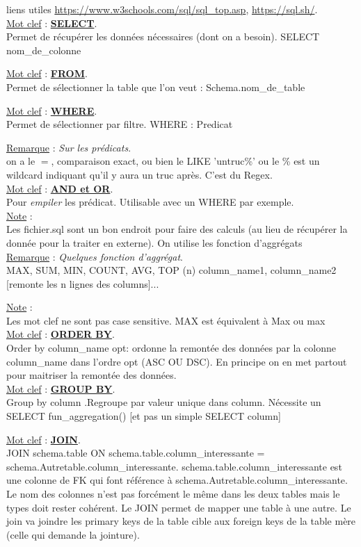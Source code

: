 \documentclass[a4paper,12pt,twoside]{article}
\newcommand{\urlcolor}{magenta}  %
\newcommand{\keycolor}{purple} %
\newcommand{\rem}[2]{\noindent\underline{Remarque} : \textit{#1}.\\ \indent #2}
\newcommand{\note}[1]{\noindent\underline{Note} : \\ \indent #1}
\newcommand{\keyref}[2]{\hypersetup{urlcolor=\keycolor} \href{#1}{\textbf{#2}}\hypersetup{urlcolor=\urlcolor}}
\newcommand{\keyword}[3]{\noindent\underline{Mot clef} : \keyref{#1}{#2}. \\ \indent #3}
\begin{document}
liens utiles \url{https://www.w3schools.com/sql/sql_top.asp}, \url{https://sql.sh/}.\\

\keyword{https://sql.sh/cours/select}{SELECT}{Permet de récupérer les données nécessaires (dont on a besoin). SELECT nom\_de\_colonne}

\keyword{https://sql.sh/cours/select}{FROM}{Permet de sélectionner la table que l'on veut : Schema.nom\_de\_table}

\keyword{https://sql.sh/cours/where}{WHERE}{Permet de sélectionner par filtre. WHERE : Predicat}

\rem{Sur les prédicats}{on a le $=$, comparaison exact, ou bien le LIKE 'untruc\%' ou le \% est un wildcard indiquant qu'il y aura un truc après. C'est du Regex.}\\

\keyword{https://sql.sh/cours/where/and-or}{AND et OR}{Pour \textit{empiler} les prédicat. Utilisable avec un WHERE par exemple.}\\

\note{Les fichier.sql sont un bon endroit pour faire des calculs (au lieu de récupérer la donnée pour la traiter en externe). On utilise les fonction d'aggrégats}\\

\rem{Quelques fonction d'aggrégat}{MAX, SUM, MIN, COUNT, AVG, TOP (n) column\_name1, column\_name2 [remonte les n lignes des columns]...}

\note{Les mot clef ne sont pas case sensitive. MAX est équivalent à Max ou max}\\

\keyword{https://sql.sh/cours/order-by}{ORDER BY}{Order by column\_name opt: ordonne la remontée des données par la colonne column\_name dans l'ordre opt (ASC OU DSC). En principe on en met partout pour maitriser la remontée des données.}\\

\keyword{https://sql.sh/cours/group-by}{GROUP BY}{Group by column .Regroupe par valeur unique dans column. Nécessite un SELECT fun\_aggregation() [et pas un simple SELECT column]}

\keyword{https://sql.sh/cours/jointures}{JOIN}{JOIN schema.table ON schema.table.column\_interessante = schema.Autretable.column\_interessante. schema.table.column\_interessante est une colonne de FK qui font référence à schema.Autretable.column\_interessante. Le nom des colonnes n'est pas forcément le même dans les deux tables mais le types doit rester cohérent. Le JOIN permet de mapper une table à une autre. Le join va joindre les primary keys de la table cible aux foreign keys de la table mère (celle qui demande la jointure).} \\
\end{document}
